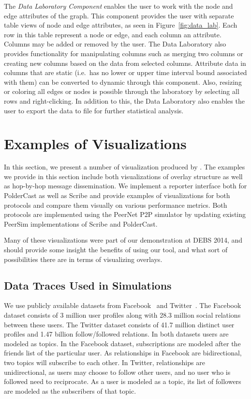 \begin{description}
    The \emph{Data Laboratory Component} enables the user to work with
    the node and edge attributes of the graph. This component provides
    the user with separate table views of node and edge attributes, as
    seen in Figure~\ref{fig:data_lab}. Each row in this table represent
    a node or edge, and each column an attribute. Columns may be added
    or removed by the user. The Data Laboratory also provides
    functionality for manipulating columns such as merging two columns
    or creating new columns based on the data from selected columns.
    Attribute data in columns that are static (i.e.\ has no lower or
    upper time interval bound associated with them) can be converted to
    dynamic through this component. Also, resizing or coloring all edges
    or nodes is possible through the laboratory by selecting all rows
    and right-clicking. In addition to this, the Data Laboratory also
    enables the user to export the data to file for further statistical
    analysis.

\end{description}

\section{Examples of Visualizations}
\label{sec:examples}

In this section, we present a number of visualization produced by \demo.
The examples we provide in this section include both visualizations of
overlay structure as well as hop-by-hop message dissemination.  We
implement a reporter interface both for PolderCast as well as Scribe and
provide examples of visualizations for both protocols and compare them
visually on various performance metrics. Both protocols are implemented
using the PeerNet P2P simulator by updating existing PeerSim
implementations of Scribe and PolderCast.

Many of these visualizations were part of our demonstration at
DEBS 2014, and should provide some insight the benefits of using
our tool, and what sort of possibilities there are in terms of
visualizing overlays.

\subsection{Data Traces Used in Simulations}

We use publicly available datasets from
Facebook~\cite{facebook-eurosys09} and Twitter~\cite{Kwak10www}. The
Facebook dataset consists of 3 million user profiles along with 28.3
million social relations between these users. The Twitter dataset
consists of 41.7 million distinct user profiles and 1.47 billion
follow/followed relations. In both datasets users are modeled as topics.
In the Facebook dataset, subscriptions are modeled after the friends
list of the particular user. As relationships in Facebook are
bidirectional, two topics will subscribe to each other. In Twitter,
relationships are unidirectional, as users may choose to follow other
users, and no user who is followed need to reciprocate.  As a user is
modeled as a topic, its list of followers are modeled as the subscribers
of that topic.


